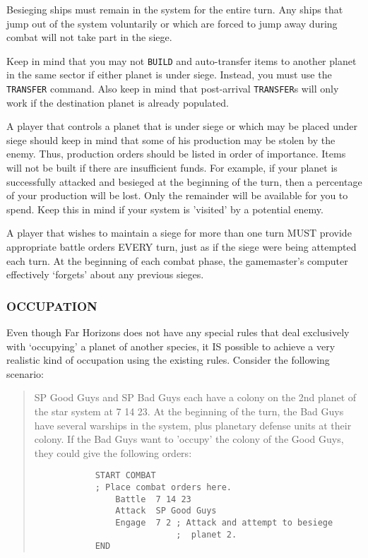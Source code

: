 \documentclass[10pt,titlepage]{article}
\begin{document}
Besieging ships must remain in the system for the entire turn.  Any ships that
jump out of the system voluntarily or which are forced to jump away during
combat will not take part in the siege.


\begin{importantnote}
	Keep in mind that you may not \texttt{BUILD} and auto-transfer items
	to another planet in the same sector if either planet is under
	siege.  Instead, you must use the \texttt{TRANSFER} command.  Also keep
	in mind that post-arrival \texttt{TRANSFER}s will only work if the
	destination planet is already populated.
\end{importantnote}

A player that controls a planet that is under siege or which may be placed
under siege should keep in mind that some of his production may be stolen by
the enemy.  Thus, production orders should be listed in order of importance.
Items will not be built if there are insufficient funds.  For example, if your
planet is successfully attacked and besieged at the beginning of the turn,
then a percentage of your production will be lost.  Only the remainder will be
available for you to spend.  Keep this in mind if your system is 'visited' by
a potential enemy.

A player that wishes to maintain a siege for more than one turn MUST provide
appropriate battle orders EVERY turn, just as if the siege were being attempted
each turn.  At the beginning of each combat phase, the gamemaster's computer
effectively `forgets' about any previous sieges.


\subsubsection{OCCUPATION}
\label{sec:occupation}


Even though Far Horizons does not have any special rules that deal exclusively
with `occupying' a planet of another species, it IS possible to achieve a very
realistic kind of occupation using the existing rules.  Consider the following
scenario:

\begin{quotation}
	SP Good Guys and SP Bad Guys each have a colony on the 2nd planet
	of the star system at 7 14 23.  At the beginning of the turn,
	the Bad Guys have several warships in the system, plus planetary
	defense units at their colony.  If the Bad Guys want to 'occupy'
	the colony of the Good Guys, they could give the following orders:

\begin{verbatim}
            START COMBAT
            ; Place combat orders here.
                Battle  7 14 23
                Attack  SP Good Guys
                Engage  7 2 ; Attack and attempt to besiege
                            ;  planet 2.
            END\end{verbatim} 
\end{quotation} 
\end{document}
